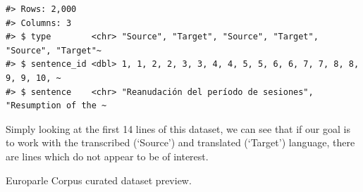 \documentclass[
  letterpaper,
]{latex/krantz}
\begin{document}
\begin{verbatim}
#> Rows: 2,000
#> Columns: 3
#> $ type        <chr> "Source", "Target", "Source", "Target", "Source", "Target"~
#> $ sentence_id <dbl> 1, 1, 2, 2, 3, 3, 4, 4, 5, 5, 6, 6, 7, 7, 8, 8, 9, 9, 10, ~
#> $ sentence    <chr> "Reanudación del período de sesiones", "Resumption of the ~
\end{verbatim}

Simply looking at the first 14 lines of this dataset, we can see that if
our goal is to work with the transcribed (`Source') and translated
(`Target') language, there are lines which do not appear to be of
interest.

\hypertarget{tbl-td-europarle-preview-1}{}
\begin{table}
\caption{\label{tbl-td-europarle-preview-1}Europarle Corpus curated dataset preview. }\tabularnewline


\end{table}
\end{document}
